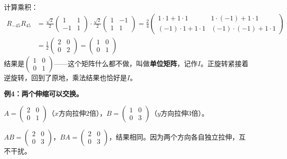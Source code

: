 \documentclass[a4paper,12pt]{ctexart}
\begin{document}
计算乘积：
\begin{align*}
R_{-45}R_{45}
&= \frac{\sqrt2}{2}\begin{pmatrix}1&1\\-1&1\end{pmatrix}
\cdot \frac{\sqrt2}{2}\begin{pmatrix}1&-1\\1&1\end{pmatrix}
= \frac{2}{4}\begin{pmatrix}1\cdot1+1\cdot1 & 1\cdot(-1)+1\cdot1\\ (-1)\cdot1+1\cdot1 & (-1)\cdot(-1)+1\cdot1\end{pmatrix}\\
&= \frac12\begin{pmatrix}2&0\\0&2\end{pmatrix}
= \begin{pmatrix}1&0\\0&1\end{pmatrix}
\end{align*}
结果是$\begin{pmatrix}1&0\\0&1\end{pmatrix}$——这个矩阵什么都不做，叫做\textbf{单位矩阵}，记作$I$。正旋转紧接着逆旋转，回到了原地，乘法结果也恰好是$I$。

\textbf{例4：两个伸缩可以交换。}

$A=\begin{pmatrix}2&0\\0&1\end{pmatrix}$（$x$方向拉伸$2$倍），$B=\begin{pmatrix}1&0\\0&3\end{pmatrix}$（$y$方向拉伸$3$倍）。

$AB=\begin{pmatrix}2&0\\0&3\end{pmatrix}$，$BA=\begin{pmatrix}2&0\\0&3\end{pmatrix}$，结果相同。因为两个方向各自独立拉伸，互不干扰。
\end{document}
